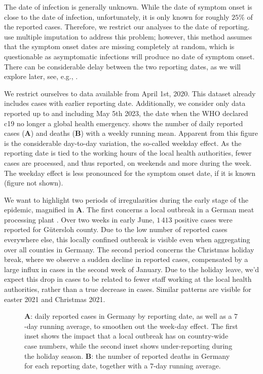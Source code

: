 The date of infection is generally unknown. While the date of symptom onset is close to the date of infection, unfortunately, it is only known for roughly $25\%$ of the reported cases. Therefore, we restrict our analyses to the date of reporting. \citep{AnDerHeiden2020Schatzung} use multiple imputation to address this problem; however, this method assumes that the symptom onset dates are missing completely at random, which is questionable as asymptomatic infections will produce no date of symptom onset. There can be considerable delay between the two reporting dates, as we will explore later, see, e.g., .

We restrict ourselves to data available from April 1st, 2020. This dataset already includes cases with earlier reporting date. Additionally, we consider only data reported up to and including May 5th 2023, the date when the WHO declared \acrshort{c19} no longer a global health emergency.  shows the number of daily reported cases (\textbf{A}) and deaths (\textbf{B}) with a weekly running mean. Apparent from this figure is the considerable day-to-day variation, the so-called weekday effect. As the reporting date is tied to the working hours of the local health authorities, fewer cases are processed, and thus reported, on weekends and more during the week. The weekday effect is less pronounced for the symptom onset date, if it is known (figure not shown). 

We want to highlight two periods of irregularities during the early stage of the epidemic, magnified in  \textbf{A}. The first concerns a local outbreak in a German meat processing plant \citep{Gunther2020SARSCoV2}. Over two weeks in early June, $1\,413$ positive cases were reported for Gütersloh county. Due to the low number of reported cases everywhere else, this locally confined outbreak is visible even when aggregating over all counties in Germany. 
The second period concerns the Christmas holiday break, where we observe a sudden decline in reported cases, compensated by a large influx in cases in the second week of January. Due to the holiday leave, we'd expect this drop in cases to be related to fewer staff working at the local health authorities, rather than a true decrease in cases. Similar patterns are visible for easter 2021 and Christmas 2021. 

\begin{figure}
    \resizebox{\textwidth}{!}{%
    }
    \caption{\textbf{A}: daily reported cases in Germany by reporting date, as well as a $7$-day running average, to smoothen out the week-day effect. The first inset shows the impact that a local outbreak \citep{Gunther2020SARSCoV2} has on country-wide case numbers, while the second inset shows under-reporting during the holiday season.  \textbf{B}: the number of reported deaths in Germany for each reporting date, together with a $7$-day running average.}
    \label{fig:cases_germany}
\end{figure}



